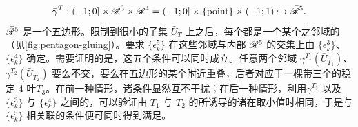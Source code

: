 \begin{equation*}
\bar\gamma^T:(-1;0]\times\mathscr{R}^3\times\mathscr{R}^4=(-1;0]\times\{\mathrm{point}\}\times(-1;1)\hookrightarrow\bar{\mathscr{R}}^5.
\end{equation*}
$\bar{\mathscr{R}}^5$ 是一个五边形。限制到\trGluingParameter{}很小的子集 $\bar{U}_T$ 上之后，每个\trGluingMap{}都是一个\trCovering{}某个\trBoundaryFace{}之邻域的\trEmbedding（见\cref{fig:pentagon-gluing}）。\trConsistency{}要求 $\{\epsilon^5_k\}$ 在这些邻域与内部 $\mathscr{R}^5$ 的交集上由 $\{\epsilon^3_k\}$、$\{\epsilon^4_k\}$ 确定。需要证明的是，这五个条件可以同时成立。任意两个邻域 $\bar\gamma^{T_1}(\bar{U}_{T_1})$、$\bar\gamma^{T_2}(\bar{U}_{T_2})$ 要么不交，要么在五边形的某个\trVertex{}附近重叠，后者对应于一棵带三个\trVertex{}的稳定 4 叶\trTree{}$T_3$。在前一种情形，诸\trConsistency{}条件显然互不干扰；在后一种情形，利用\trGluingMap{}$\bar\gamma^{T_3}$ 以及 $\{\epsilon^3_k\}$ 与 $\{\epsilon^4_k\}$ 之间的\trConsistency，可以验证由 $T_1$ 与 $T_2$ 的\trGluingConstruction{}所诱导的诸\trStriplikeEnd{}在\trGluingParameter{}取小值时相同，于是与 $\{\epsilon^5_k\}$ 相关联的\trConsistency{}条件便可同时得到满足。
